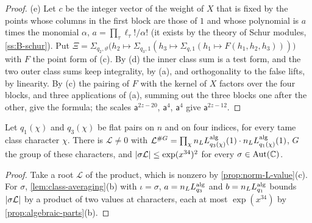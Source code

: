 \begin{proof}
(e) Let $c$ be the integer vector of the weight of $X$ that is fixed by the points whose columns in the first block are those of $1$ and whose polynomial is $a$ times the monomial $\alpha$, $a=\prod_\tau\ell_\tau!/\alpha!$ (it exists by the
theory of Schur modules, \cref{ss:B-schur}). Put $\Xi=\Sigma_{q_2,\vartheta}\bigl(h_2\mapsto\Sigma_{q_3,1}(h_3\mapsto\Sigma_{q,1}(h_1\mapsto F(h_1,h_2,h_3)))\bigr)$ with $F$ the point form of (c). By (d) the inner class sum is a test form, and the two outer class sums
keep integrality, by (a), and orthogonality to the false lifts, by linearity. By (c) the pairing of $F$ with the kernel of $X$ factors over the four blocks, and three applications of (a), summing out the three blocks one after the
other, give the formula; the scales $\mathsf a^{2z-20}$, $\mathsf a^4$, $\mathsf a^4$ give $\mathsf a^{2z-12}$.
\end{proof}

\begin{lemma}\label{lem:geometric-mean}
Let $q_1(\chi)$ and $q_3(\chi)$ be flat pairs on $n$ and on four indices, for every tame class character $\chi$. There is $\mathcal L\ne0$ with $\mathcal L^{\#G}=\prod_\chi n_LL^{\rm alg}_{q_3(\chi)}(1)\cdot n_LL^{\rm alg}_{q_1(\chi)}(1)$, $G$ the group of these
characters, and $\lvert \sigma\mathcal L\rvert\le\exp(x^{34})^2$ for every $\sigma\in\mathrm{Aut}(\mathbb{C})$.
\end{lemma}

\begin{proof}
Take a root $\mathcal L$ of the product, which is nonzero by \cref{prop:norm-L-value}(c). For $\sigma$, \cref{lem:class-averaging}(b) with $\iota=\sigma$, $a=n_LL^{\rm alg}_{q_3}$ and $b=n_LL^{\rm alg}_{q_1}$ bounds $\lvert \sigma\mathcal L\rvert$ by a product of two values at
characters, each at most $\exp(x^{34})$ by \cref{prop:algebraic-parts}(b).
\end{proof}

